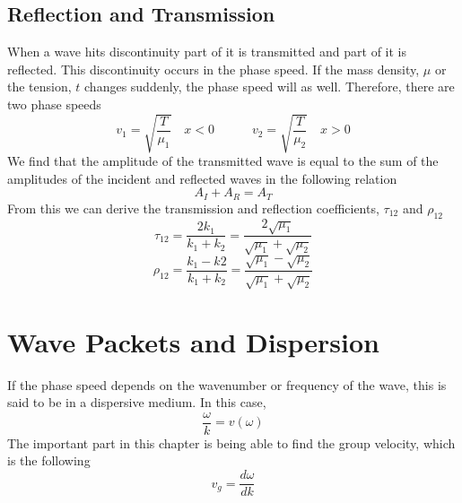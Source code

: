 \documentclass[11pt]{article}
\begin{document}
\subsection{Reflection and Transmission}
When a wave hits discontinuity part of it is transmitted and part of it is reflected. This discontinuity occurs in the phase speed. If the mass density, $\mu$ or the tension, $t$ changes suddenly, the phase speed will as well. Therefore, there are two phase speeds
$$ v_1 =\sqrt{ \frac{T}{\mu_1}} \quad x<0 \quad \quad \quad v_2 =\sqrt{ \frac{T}{\mu_2}} \quad x>0 $$
We find that the amplitude of the transmitted wave is equal to the sum of the amplitudes of the incident and reflected waves in the following relation
$$ A_I + A_R = A_T$$
From this we can derive the transmission and reflection coefficients, $\tau_{12}$ and $\rho_{12}$
$$ \tau_{12} = \frac{2k_1}{k_1+k_2} = \frac{2\sqrt{\mu_1}}{\sqrt{\mu_1}+\sqrt{\mu_2}}$$
$$ \rho_{12} = \frac{k_1-k2}{k_1+k_2} = \frac{\sqrt{\mu_1}-\sqrt{\mu_2}}{\sqrt{\mu_1}+\sqrt{\mu_2}}$$

\pagebreak
\section{Wave Packets and Dispersion}

If the phase speed depends on the wavenumber or frequency of the wave, this is said to be in a dispersive medium. In this case,
$$ \frac{\omega}{k} = v(\omega)$$
The important part in this chapter is being able to find the group velocity, which is the following
$$ v_g = \frac{d\omega}{dk}$$ 
\pagebreak
\end{document}
